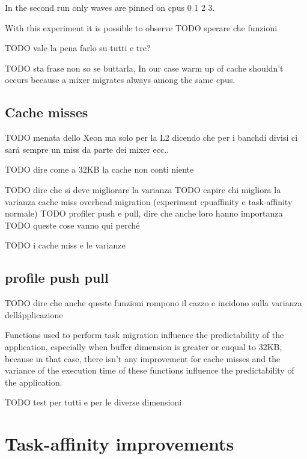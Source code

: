 In the second run only waves are pinned on cpus 0 1 2 3. 

With this experiment it is possible to observe  TODO sperare che funzioni

TODO vale la pena farlo su tutti e tre?

TODO sta frase non so se buttarla, In our case warm up of cache shouldn't occurs because a mixer migrates always among the same cpus.

\subsection{Cache misses}

TODO menata dello Xeon ma solo per la L2 dicendo che per i banchdi divisi ci sar\'a sempre un miss da parte dei mixer ecc..

TODO dire come a 32KB la cache non conti niente


TODO dire che si deve migliorare la varianza
TODO capire chi migliora la varianza cache miss overhead migration (experiment cpuaffinity e task-affinity normale)
TODO profiler push e pull, dire che anche loro hanno importanza
TODO queste cose vanno qui perch\'e 


TODO i cache miss e le varianze

\subsection{profile push pull}

TODO dire che anche queste funzioni rompono il cazzo e incidono sulla varianza dell\'applicazione

Functions used to perform task migration influence the predictability of the application, especially when buffer dimension is greater or euqual to 32KB, 
because in that case, there isn't any improvement for cache misses and the variance of the execution time of these functions influence the predictability
of the application. 



TODO test per tutti e per le diverse dimensioni





\section{Task-affinity improvements}

